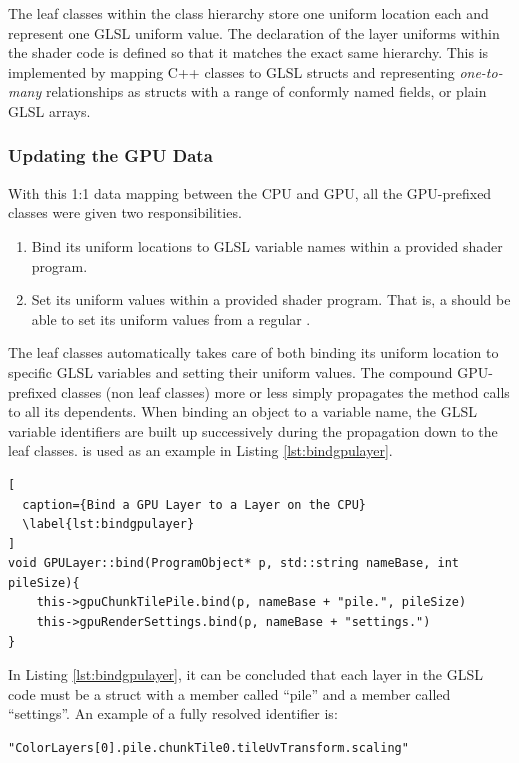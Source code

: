 The leaf classes within the class hierarchy store one uniform location each and represent one GLSL uniform value. The declaration of the layer uniforms within the shader code is defined so that it matches the exact same hierarchy. This is implemented by mapping C++ classes to GLSL structs and representing \emph{one-to-many} relationships as structs with a range of conformly named fields, or plain GLSL arrays.

\subsubsection{Updating the GPU Data}

With this 1:1 data mapping between the CPU and GPU, all the GPU-prefixed classes were given two responsibilities.

\begin{enumerate}
\item Bind its uniform locations to GLSL variable names within a provided shader program.
\item Set its uniform values within a provided shader program. That is, a  should be able to set its uniform values from a regular .
\end{enumerate}

The leaf classes automatically takes care of both binding its uniform location to specific GLSL variables and  setting their uniform values. The compound GPU-prefixed classes (non leaf classes) more or less simply propagates the method calls to all its dependents. When binding an object to a variable name, the GLSL variable identifiers are built up successively during the propagation down to the leaf classes.  is used as an example in Listing \ref{lst:bindgpulayer}.

\begin{lstlisting}[
  caption={Bind a GPU Layer to a Layer on the CPU} 
  \label{lst:bindgpulayer}
]
void GPULayer::bind(ProgramObject* p, std::string nameBase, int pileSize){
	this->gpuChunkTilePile.bind(p, nameBase + "pile.", pileSize)
	this->gpuRenderSettings.bind(p, nameBase + "settings.")
}
\end{lstlisting}

In Listing \ref{lst:bindgpulayer}, it can be concluded that each layer in the GLSL code must be a struct with a member called ``pile'' and a member called ``settings''. An example of a fully resolved identifier is: 

\begin{lstlisting}[]
"ColorLayers[0].pile.chunkTile0.tileUvTransform.scaling"
\end{lstlisting}

